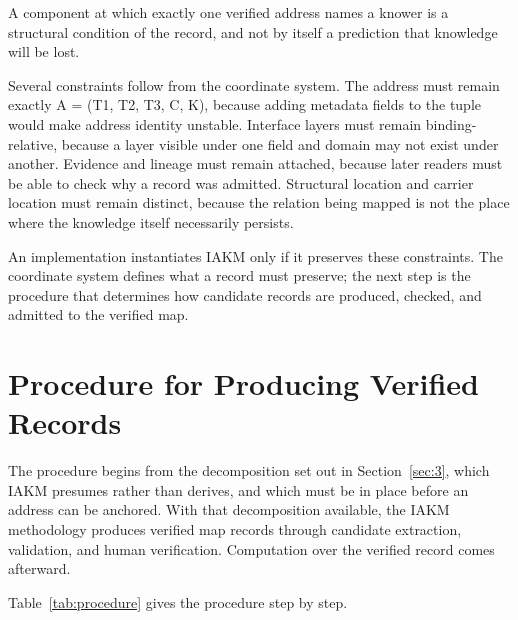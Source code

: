 \documentclass[preprints,article,submit,moreauthors]{Definitions/mdpi}
\begin{document}
A component at which exactly one verified address names a knower is a structural condition of the record, and not by itself a prediction that knowledge will be lost.

Several constraints follow from the coordinate system. The address must remain exactly A = (T1, T2, T3, C, K), because adding metadata fields to the tuple would make address identity unstable. Interface layers must remain binding-relative, because a layer visible under one field and domain may not exist under another. Evidence and lineage must remain attached, because later readers must be able to check why a record was admitted. Structural location and carrier location must remain distinct, because the relation being mapped is not the place where the knowledge itself necessarily persists.

An implementation instantiates IAKM only if it preserves these constraints. The coordinate system defines what a record must preserve; the next step is the procedure that determines how candidate records are produced, checked, and admitted to the verified map.

\section{Procedure for Producing Verified Records}\label{sec:6}

The procedure begins from the decomposition set out in Section~\ref{sec:3}, which IAKM presumes rather than derives, and which must be in place before an address can be anchored. With that decomposition available, the IAKM methodology produces verified map records through candidate extraction, validation, and human verification. Computation over the verified record comes afterward.

Table~\ref{tab:procedure} gives the procedure step by step.
\end{document}
